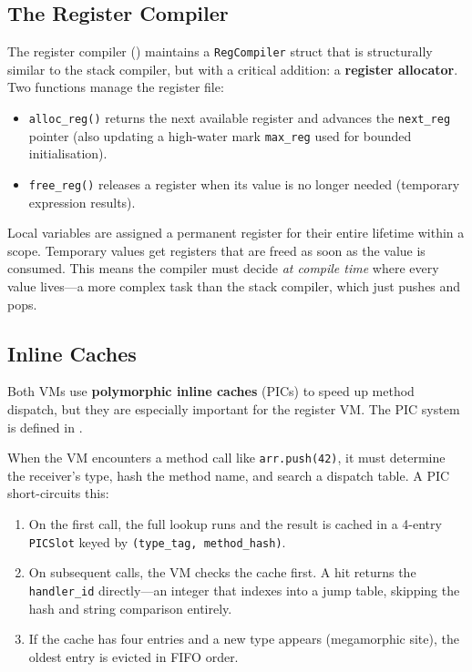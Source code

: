 \subsection{The Register Compiler}\label{subsec:reg-compiler}

The register compiler () maintains a
\lstinline|RegCompiler| struct that is structurally similar to the stack
compiler, but with a critical addition: a \textbf{register allocator}. Two
functions manage the register file:

\begin{itemize}
  \item \lstinline|alloc_reg()| returns the next available register and advances
        the \lstinline|next_reg| pointer (also updating a high-water mark
        \lstinline|max_reg| used for bounded initialisation).
  \item \lstinline|free_reg()| releases a register when its value is no longer
        needed (temporary expression results).
\end{itemize}

Local variables are assigned a permanent register for their entire lifetime
within a scope. Temporary values get registers that are freed as soon as the
value is consumed. This means the compiler must decide \emph{at compile time}
where every value lives---a more complex task than the stack compiler, which
just pushes and pops.

\subsection{Inline Caches}\label{subsec:inline-caches}

Both VMs use \textbf{polymorphic inline caches} (PICs) to speed up method
dispatch, but they are especially important for the register VM. The PIC
system is defined in .

When the VM encounters a method call like \lstinline|arr.push(42)|, it must
determine the receiver's type, hash the method name, and search a dispatch
table. A PIC short-circuits this:

\begin{enumerate}
  \item On the first call, the full lookup runs and the result is cached in a
        4-entry \lstinline|PICSlot| keyed by \texttt{(type\_tag, method\_hash)}.
  \item On subsequent calls, the VM checks the cache first. A hit returns the
        \lstinline|handler_id| directly---an integer that indexes into a
        jump table, skipping the hash and string comparison entirely.
  \item If the cache has four entries and a new type appears (megamorphic site),
        the oldest entry is evicted in FIFO order.
\end{enumerate}

